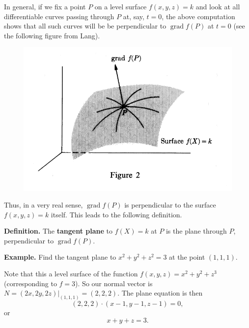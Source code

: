 \documentclass{article}
\DeclareMathOperator{\grd}{grad}
\begin{document}
In general, if we fix a point $P$ on a level surface $f(x,y,z)=k$ and look at all
differentiable curves passing through $P$ at, say, $t=0$, the above computation shows that all such curves
will be be perpendicular to $\grd{f}(P)$ at $t=0$ (see the following figure from Lang).
\begin{figure}[h]
    \centering
    \includegraphics[scale = 0.5]{tangent1.PNG}
\end{figure}
Thus, in a very real sense, $\grd f(P)$ is perpendicular to the surface $f(x,y,z)=k$ itself.
This leads to the following definition.

\textbf{Definition.} The \textbf{tangent plane} to $f(X)=k$ at $P$ is the plane through $P$,
perpendicular to $\grd f(P)$.

\textbf{Example.} Find the tangent plane to $x^2+y^2+z^2=3$ at the point $(1,1,1)$. 

Note that this a level surface of the function $f(x,y,z)=x^2+y^2+z^3$ (corresponding to $f=3$). 
So our normal vector is $N = (2x,2y,2z)|_{(1,1,1)} = (2,2,2)$. The plane equation is then
\[(2,2,2)\cdot(x-1,y-1,z-1)=0,\]
or
\[x+y+z=3.\]
\end{document}
